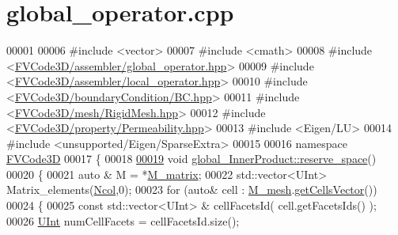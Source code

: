 \hypertarget{global__operator_8cpp_source}{}\section{global\+\_\+operator.\+cpp}
\label{global__operator_8cpp_source}

\begin{DoxyCode}
00001 
00006 \textcolor{preprocessor}{#include <vector>}
00007 \textcolor{preprocessor}{#include <cmath>}
00008 \textcolor{preprocessor}{#include <\hyperlink{global__operator_8hpp}{FVCode3D/assembler/global\_operator.hpp}>}
00009 \textcolor{preprocessor}{#include <\hyperlink{local__operator_8hpp}{FVCode3D/assembler/local\_operator.hpp}>}
00010 \textcolor{preprocessor}{#include <\hyperlink{BC_8hpp}{FVCode3D/boundaryCondition/BC.hpp}>}
00011 \textcolor{preprocessor}{#include <\hyperlink{RigidMesh_8hpp}{FVCode3D/mesh/RigidMesh.hpp}>}
00012 \textcolor{preprocessor}{#include <\hyperlink{Permeability_8hpp}{FVCode3D/property/Permeability.hpp}>}
00013 \textcolor{preprocessor}{#include <Eigen/LU>}
00014 \textcolor{preprocessor}{#include <unsupported/Eigen/SparseExtra>}
00015 
00016 \textcolor{keyword}{namespace }\hyperlink{namespaceFVCode3D}{FVCode3D}
00017 \{
00018         
\hypertarget{global__operator_8cpp_source.tex_l00019}{}\hyperlink{classFVCode3D_1_1global__InnerProduct_ad0aeb15cd9fffc009025e5bb5e4ed5b4}{00019} \textcolor{keywordtype}{void} \hyperlink{classFVCode3D_1_1global__InnerProduct_ad0aeb15cd9fffc009025e5bb5e4ed5b4}{global\_InnerProduct::reserve\_space}()      
00020 \{
00021         \textcolor{keyword}{auto} & M = *\hyperlink{classFVCode3D_1_1global__Operator_ab45426efec09f5245e9107794eb7bbd9}{M\_matrix};
00022         std::vector<UInt> Matrix\_elements(\hyperlink{classFVCode3D_1_1global__Operator_a10945c9c802a23ee22d993424aef1ecb}{Ncol},0);
00023         \textcolor{keywordflow}{for} (\textcolor{keyword}{auto}& cell : \hyperlink{classFVCode3D_1_1global__Operator_a027911d0f801f6f19a3006329ec30a7f}{M\_mesh}.\hyperlink{classFVCode3D_1_1Rigid__Mesh_afefb62f2c37317402b495e2369ed495b}{getCellsVector}())
00024         \{
00025         \textcolor{keyword}{const} std::vector<UInt> & cellFacetsId( cell.getFacetsIds() );
00026         \hyperlink{namespaceFVCode3D_a4bf7e328c75d0fd504050d040ebe9eda}{UInt} numCellFacets = cellFacetsId.size();

\end{DoxyCode}
